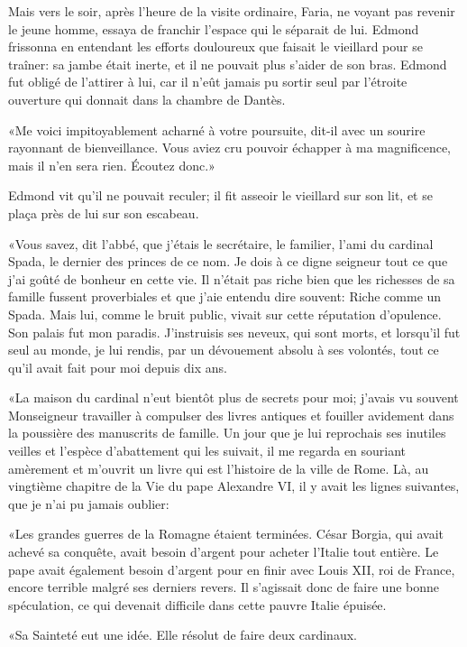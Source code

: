 Mais vers le soir, après l'heure de la visite ordinaire, Faria, ne voyant pas revenir le jeune homme, essaya de franchir l'espace qui le séparait de lui. Edmond frissonna en entendant les efforts douloureux que faisait le vieillard pour se traîner: sa jambe était inerte, et il ne pouvait plus s'aider de son bras. Edmond fut obligé de l'attirer à lui, car il n'eût jamais pu sortir seul par l'étroite ouverture qui donnait dans la chambre de Dantès.

«Me voici impitoyablement acharné à votre poursuite, dit-il avec un sourire rayonnant de bienveillance. Vous aviez cru pouvoir échapper à ma magnificence, mais il n'en sera rien. Écoutez donc.»

Edmond vit qu'il ne pouvait reculer; il fit asseoir le vieillard sur son lit, et se plaça près de lui sur son escabeau.

«Vous savez, dit l'abbé, que j'étais le secrétaire, le familier, l'ami du cardinal Spada, le dernier des princes de ce nom. Je dois à ce digne seigneur tout ce que j'ai goûté de bonheur en cette vie. Il n'était pas riche bien que les richesses de sa famille fussent proverbiales et que j'aie entendu dire souvent: Riche comme un Spada. Mais lui, comme le bruit public, vivait sur cette réputation d'opulence. Son palais fut mon paradis. J'instruisis ses neveux, qui sont morts, et lorsqu'il fut seul au monde, je lui rendis, par un dévouement absolu à ses volontés, tout ce qu'il avait fait pour moi depuis dix ans.

«La maison du cardinal n'eut bientôt plus de secrets pour moi; j'avais vu souvent Monseigneur travailler à compulser des livres antiques et fouiller avidement dans la poussière des manuscrits de famille. Un jour que je lui reprochais ses inutiles veilles et l'espèce d'abattement qui les suivait, il me regarda en souriant amèrement et m'ouvrit un livre qui est l'histoire de la ville de Rome. Là, au vingtième chapitre de la Vie du pape Alexandre VI, il y avait les lignes suivantes, que je n'ai pu jamais oublier:

«Les grandes guerres de la Romagne étaient terminées. César Borgia, qui avait achevé sa conquête, avait besoin d'argent pour acheter l'Italie tout entière. Le pape avait également besoin d'argent pour en finir avec Louis XII, roi de France, encore terrible malgré ses derniers revers. Il s'agissait donc de faire une bonne spéculation, ce qui devenait difficile dans cette pauvre Italie épuisée.

«Sa Sainteté eut une idée. Elle résolut de faire deux cardinaux.

